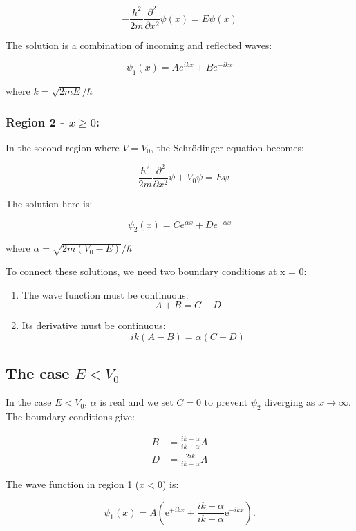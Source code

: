 \documentclass[
  a4paper,
]{book}
\begin{document}
\[
- \frac{\hbar^2}{2m} \frac{\partial^2}{\partial x^2} \psi\left( x \right) = E \psi \left( x \right)
\]

The solution is a combination of incoming and reflected waves:

\[
\psi_1(x) = A e^{ikx} + B e^{-ikx}
\]

where \(k = \sqrt{2mE}/\hbar\)

\subsubsection{\texorpdfstring{Region 2 -
\(x \ge 0\):}{Region 2 - x \textbackslash ge 0:}}\label{region-2---x-ge-0}

In the second region where \(V = V_0\), the Schrödinger equation
becomes:

\[
- \frac{\hbar^2}{2m} \frac{\partial^2}{\partial x^2} \psi + V_0 \psi = E \psi
\]

The solution here is:

\[
\psi_2(x) = C e^{\alpha x} + D e^{-\alpha x}
\]

where \(\alpha = \sqrt{2m(V_0 - E)}/\hbar\)

To connect these solutions, we need two boundary conditions at x = 0:

\begin{enumerate}
\def\labelenumi{\arabic{enumi}.}
\item
  The wave function must be continuous: \[A + B = C + D\]
\item
  Its derivative must be continuous: \[ik(A - B) = \alpha(C - D)\]
\end{enumerate}

\subsection{\texorpdfstring{The case
\(E < V_0\)}{The case E \textless{} V\_0}}\label{the-case-e-v_0}

In the case \(E<V_0\), \(\alpha\) is real and we set \(C=0\) to prevent
\(\psi_2\) diverging as \(x \to \infty\). The boundary conditions give:

\[
\begin{aligned}
B & =  \frac{i k + \alpha}{i k - \alpha} A\\
D & =  \frac{2 i k}{i k - \alpha} A
\end{aligned}
\]

The wave function in region 1 (\(x < 0\)) is:

\[
\psi_{\mathrm{1}} \left( x \right) = A \left( \mathrm{e}^{+i k x} + \frac{i k + \alpha}{i k - \alpha} \mathrm{e}^{-i k x} \right)\mathrm{.}
\]
\end{document}
